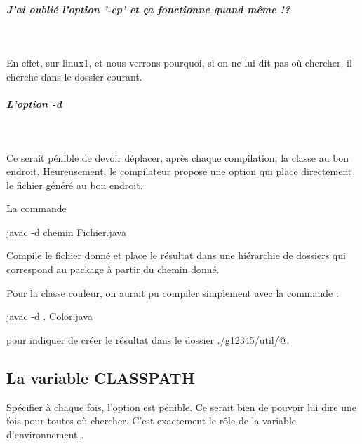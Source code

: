 \documentclass[a4paper,11pt]{article}
\begin{document}
		\subparagraph{J'ai oubli\'e l'option '-cp' et \c ca fonctionne quand m\^eme !?} 
		
					\textcolor{white}{.} \par
				
          		En effet, sur linux1, et nous verrons pourquoi, si on ne lui  dit pas o\`u chercher, 
			il cherche dans le dossier courant.
		
            		\par
        
			
		\subparagraph{L'option -d} 
		
					\textcolor{white}{.} \par

			Ce serait p\'enible de devoir d\'eplacer, apr\`es chaque compilation,
			la classe au bon endroit. Heureusement, le compilateur propose une option
			qui place directement le fichier g\'en\'er\'e au bon endroit.
		
            		\par
        
			La commande
		
            		\par
       			 \begin{Console}
				javac -d chemin Fichier.java
			\end{Console}
			Compile le fichier donn\'e et place le r\'esultat dans une hi\'erarchie de dossiers
			qui correspond au package \`a partir du chemin donn\'e.
		
           		 \par
        
			
		\begin{Exemple}{} 
			Pour la classe couleur, on aurait pu compiler simplement avec la commande :
				\begin{Console}
					javac -d . Color.java
				\end{Console}
			pour indiquer de cr\'eer le r\'esultat dans le dossier \verb@./g12345/util/@.
		\end{Exemple}
		
            \par
        \subsection{La variable CLASSPATH}
		Sp\'ecifier \`a chaque fois, l'option \verb@cp@ est p\'enible.
		Ce serait bien de pouvoir lui dire une fois pour toutes o\`u chercher.
		C'est exactement le r\^ole de la variable d'environnement \verb@CLASSPATH@.
			
\end{document}
